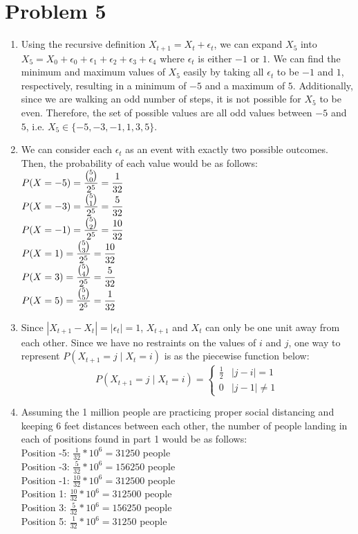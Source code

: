 \documentclass{article}
\begin{document}
\section*{Problem 5}
\begin{enumerate}
    \item Using the recursive definition $X_{t+1}=X_t+\epsilon_t$, we can expand $X_5$ into $X_5=X_0+\epsilon_0+\epsilon_1+\epsilon_2+\epsilon_3+\epsilon_4$ where $\epsilon_t$ is either $-1$ or $1$. We can find the minimum and maximum values of $X_5$ easily by taking all $\epsilon_t$ to be $-1$ and $1$, respectively, resulting in a minimum of $-5$ and a maximum of $5$. Additionally, since we are walking an odd number of steps, it is not possible for $X_5$ to be even. Therefore, the set of possible values are all odd values between $-5$ and $5$, i.e. $X_5\in\{-5,-3,-1,1,3,5\}$.
    \item
          We can consider each $\epsilon_t$ as an event with exactly two possible outcomes. Then, the probability of each value would be as follows:\\
          $\mathlarger{P(X=-5)=\frac{\binom{5}{0}}{2^5}=\frac{1}{32}}$\\
          $\mathlarger{P(X=-3)=\frac{\binom{5}{1}}{2^5}=\frac{5}{32}}$\\
          $\mathlarger{P(X=-1)=\frac{\binom{5}{2}}{2^5}=\frac{10}{32}}$\\
          $\mathlarger{P(X=1)=\frac{\binom{5}{3}}{2^5}=\frac{10}{32}}$\\
          $\mathlarger{P(X=3)=\frac{\binom{5}{4}}{2^5}=\frac{5}{32}}$\\
          $\mathlarger{P(X=5)=\frac{\binom{5}{5}}{2^5}=\frac{1}{32}}$
    \item Since $|X_{t+1}-X_t|=|\epsilon_t|=1$, $X_{t+1}$ and $X_t$ can only be one unit away from each other. Since we have no restraints on the values of $i$ and $j$, one way to represent $P(X_{t+1}=j\mid X_t=i)$ is as the piecewise function below:
          \[
              P(X_{t+1}=j\mid X_t=i)=
              \begin{cases}
                  \frac{1}{2} & |j-i|=1     \\
                  0           & |j-1|\neq 1
              \end{cases}
          \]
    \item Assuming the 1 million people are practicing proper social distancing and keeping 6 feet distances between each other, the number of people landing in each of positions found in part 1 would be as follows:\\
          Position -5: $\frac{1}{32}*10^6=31250$ people\\
          Position -3: $\frac{5}{32}*10^6=156250$ people\\
          Position -1: $\frac{10}{32}*10^6=312500$ people\\
          Position 1: $\frac{10}{32}*10^6=312500$ people\\
          Position 3: $\frac{5}{32}*10^6=156250$ people\\
          Position 5: $\frac{1}{32}*10^6=31250$ people
\end{enumerate}
\end{document}
